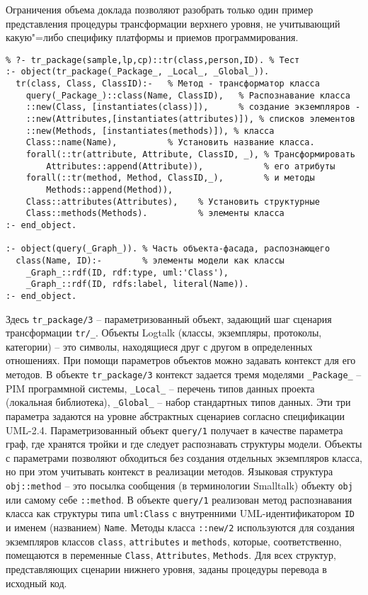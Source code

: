 \documentclass[12pt]{article}
\begin{document}
Ограничения объема доклада позволяют разобрать только один пример представления процедуры трансформации верхнего уровня, не учитывающий какую"=либо специфику платформы и приемов программирования.
\begin{verbatim}
% ?- tr_package(sample,lp,cp)::tr(class,person,ID). % Тест
:- object(tr_package(_Package_, _Local_, _Global_)).
  tr(class, Class, ClassID):-   % Метод - трансформатор класса
    query(_Package_)::class(Name, ClassID),   % Распознавание класса
    ::new(Class, [instantiates(class)]),      % создание экземпляров -
    ::new(Attributes,[instantiates(attributes)]), % списков элементов
    ::new(Methods, [instantiates(methods)]), % класса
    Class::name(Name),          % Установить название класса.
    forall(::tr(attribute, Attribute, ClassID, _), % Трансформировать
        Attributes::append(Attribute)),            % его атрибуты
    forall(::tr(method, Method, ClassID,_),        % и методы
        Methods::append(Method)),
    Class::attributes(Attributes),    % Установить структурные
    Class::methods(Methods).          % элементы класса
:- end_object.

:- object(query(_Graph_)). % Часть объекта-фасада, распознающего
  class(Name, ID):-        % элементы модели как классы
    _Graph_::rdf(ID, rdf:type, uml:'Class'),
    _Graph_::rdf(ID, rdfs:label, literal(Name)).
:- end_object.
\end{verbatim}

Здесь \texttt{tr\_package/3} -- параметризованный объект, задающий шаг сценария трансформации \texttt{tr/\_}.  Объекты Logtalk (классы, экземпляры, протоколы, категории) -- это символы, находящиеся друг с другом в определенных отношениях.  При помощи параметров объектов можно задавать контекст для его методов.  В объекте \texttt{tr\_package/3} контекст задается тремя моделями \texttt{\_Package\_} -- PIM программной системы, \texttt{\_Local\_} -- перечень типов данных проекта (локальная библиотека), \texttt{\_Global\_} -- набор стандартных типов данных.  Эти три параметра задаются на уровне абстрактных сценариев согласно спецификации UML-2.4.  Параметризованный объект \texttt{query/1} получает в качестве параметра граф, где хранятся тройки и где следует распознавать структуры модели.  Объекты с параметрами позволяют обходиться без создания отдельных экземпляров класса, но при этом учитывать контекст в реализации методов.  Языковая структура \texttt{obj::method} -- это посылка сообщения (в терминологии Smalltalk) объекту \texttt{obj} или самому себе \texttt{::method}.  В объекте \texttt{query/1} реализован метод распознавания класса как структуры типа \texttt{uml:Class} с внутренними UML-идентификатором \texttt{ID} и именем (названием) \texttt{Name}.  Методы класса \texttt{::new/2} используются для создания экземпляров классов \texttt{class}, \texttt{attributes} и \texttt{methods}, которые, соответственно, помещаются в переменные \texttt{Class}, \texttt{Attributes}, \texttt{Methods}.  Для всех структур, представляющих сценарии нижнего уровня, заданы процедуры перевода в исходный код.
\end{document}
